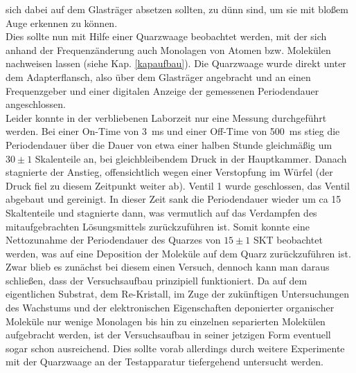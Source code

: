 sich dabei auf dem Glasträger absetzen sollten, zu dünn sind, um sie mit bloßem Auge
erkennen zu können.
\\
Dies sollte nun mit Hilfe einer Quarzwaage beobachtet werden, mit der sich anhand der
Frequenzänderung auch Monolagen von Atomen bzw. Molekülen nachweisen lassen (siehe Kap.
\ref{kapaufbau}). Die Quarzwaage wurde direkt unter dem Adapterflansch, also über dem Glasträger
angebracht und an einen Frequenzgeber und einer digitalen Anzeige der gemessenen Periodendauer
angeschlossen.
\\
Leider konnte in der verbliebenen Laborzeit nur eine Messung durchgeführt werden. Bei einer
On-Time von \SI{3}{ms} und einer Off-Time von \SI{500}{ms} stieg die Periodendauer über die Dauer
von etwa einer halben Stunde gleichmäßig um $30\pm1$ Skalenteile an, bei gleichbleibendem Druck in der
Hauptkammer. Danach stagnierte der Anstieg, offensichtlich wegen einer Verstopfung im Würfel (der
Druck fiel zu diesem Zeitpunkt weiter ab). Ventil 1 wurde geschlossen, das Ventil abgebaut und
gereinigt. In dieser Zeit sank die Periodendauer wieder um ca 15 Skaltenteile und stagnierte dann,
was vermutlich auf das Verdampfen des mitaufgebrachten Lösungsmittels zurückzuführen ist. Somit
konnte eine Nettozunahme der Periodendauer des Quarzes von $15\pm1$ SKT beobachtet werden, was auf
eine Deposition der Moleküle auf dem Quarz zurückzuführen ist.
\\
Zwar blieb es zunächst bei diesem einen Versuch, dennoch kann man daraus schließen, dass der
Versuchsaufbau prinzipiell funktioniert. Da auf dem eigentlichen Substrat, dem Re-Kristall,
im Zuge der zukünftigen Untersuchungen des Wachstums und der elektronischen Eigenschaften
deponierter organischer Moleküle nur wenige Monolagen bis hin zu einzelnen separierten Molekülen
aufgebracht werden, ist der Versuchsaufbau in seiner jetzigen Form eventuell sogar schon
ausreichend.
Dies sollte vorab allerdings durch weitere Experimente mit der Quarzwaage an der Testapparatur
tiefergehend untersucht werden.

